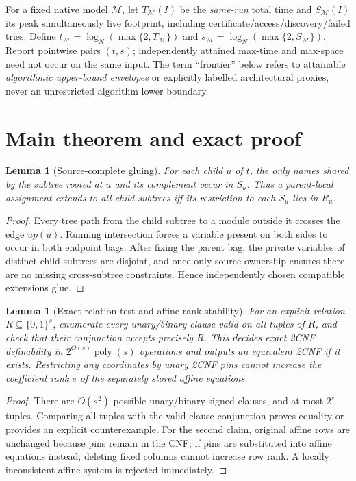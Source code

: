 \documentclass[10pt]{article}
\newtheorem{lemma}[theorem]{Lemma}
\begin{document}
For a fixed native model $\mathcal M$, let $T_{\mathcal M}(I)$ be the \emph{same-run} total time and $S_{\mathcal M}(I)$ its peak simultaneously live footprint, including certificate/access/discovery/failed tries. Define $t_{\mathcal M}=\log_N(\max\{2,T_{\mathcal M}\})$ and $s_{\mathcal M}=\log_N(\max\{2,S_{\mathcal M}\})$. Report pointwise pairs $(t,s)$; independently attained max-time and max-space need not occur on the same input. The term ``frontier'' below refers to attainable \emph{algorithmic upper-bound envelopes} or explicitly labelled architectural proxies, never an unrestricted algorithm lower boundary.
\section{Main theorem and exact proof}
\begin{lemma}[Source-complete gluing]
For each child $u$ of $t$, the only names shared by the subtree rooted at $u$ and its complement occur in $S_u$. Thus a parent-local assignment extends to all child subtrees iff its restriction to each $S_u$ lies in $R_u$.
\end{lemma}
\begin{proof}
Every tree path from the child subtree to a module outside it crosses the edge $up(u)$. Running intersection forces a variable present on both sides to occur in both endpoint bags. After fixing the parent bag, the private variables of distinct child subtrees are disjoint, and once-only source ownership ensures there are no missing cross-subtree constraints. Hence independently chosen compatible extensions glue.
\end{proof}
\begin{lemma}[Exact relation test and affine-rank stability]
For an explicit relation $R\subseteq\{0,1\}^s$, enumerate every unary/binary clause valid on all tuples of $R$, and check that their conjunction accepts precisely $R$. This decides exact 2CNF definability in $2^{O(s)}\operatorname{poly}(s)$ operations and outputs an equivalent 2CNF if it exists. Restricting any coordinates by unary \emph{2CNF pins} cannot increase the coefficient rank $e$ of the separately stored affine equations.
\end{lemma}
\begin{proof}
There are $O(s^2)$ possible unary/binary signed clauses, and at most $2^s$ tuples. Comparing all tuples with the valid-clause conjunction proves equality or provides an explicit counterexample. For the second claim, original affine rows are unchanged because pins remain in the CNF; if pins are substituted into affine equations instead, deleting fixed columns cannot increase row rank. A locally inconsistent affine system is rejected immediately.
\end{proof}
\end{document}
